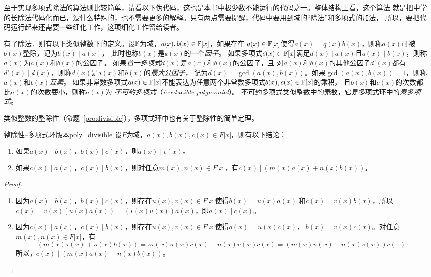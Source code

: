 至于实现多项式除法的算法则比较简单，请看以下伪代码，这也是本书中极少数不能运行的代码之一。整体结构上看，这个算法
就是把中学的长除法代码化而已，没什么特殊的，也不需要更多的解释。只有两点需要提醒，代码中要用到域的“除法”和多项式的加法，
所以，要把代码运行起来还需要一些细化工作，这项细化工作留给读者。
\begin{center}
	
\end{center}

有了除法，则有以下类似整数下的定义。设${\mathbb F}$为域，$a(x),b(x) \in {\mathbb F}\lbrack x \rbrack$，如果存在
$q(x) \in {\mathbb F}\lbrack x \rbrack$使得$a(x) = q(x)b(x)$，则称$a(x)$可被 $b(x)$整除，记为$b(x) \mid a(x)$，
此时也称$b(x)$是$a(x)$的一个\emph{因子}。
如果多项式$d(x)\in {\mathbb F}\lbrack x \rbrack$满足$d(x) \mid a(x)$且$d(x) \mid b(x)$，则称$d(x)$为$a(x)$和$b(x)$的公因子。
如果\emph{首一多项式}$d(x)$是$a(x)$和$b(x)$的公因子，且
对$a(x)$和$b(x)$的其他公因子$d'(x)$都有$d'(x) \mid d(x)$，则称$d(x)$是$a(x)$和$b(x)$的\emph{最大公因子}，
记为$d(x)=\gcd(a(x), b(x))$。如果$\gcd(a(x), b(x)) = 1$，则称$a(x)$和$b(x)$\emph{互素}。
如果非常数多项式$a(x) \in {\mathbb F}\lbrack x \rbrack$不能表达为任意两个非常数多项式$b(x), c(x)  \in {\mathbb F}\lbrack x \rbrack$的乘积，
且$b(x)$和$c(x)$的次数都比$a(x)$的次数要小，则称$a(x)$为
\emph{不可约多项式}（\emph{irreducible polynomial}）。
不可约多项式类似整数中的素数，它是多项式环中的\emph{素多项式}。

类似整数的整除性（命题~\ref{pro:divisible}），多项式环中也有关于整除性的简单定理。
\begin{proposition}{整除性--多项式环版本}{poly_divisible}
设$F$为域，$a(x),b(x),c(x) \in F\lbrack x \rbrack$，则有以下结论：
\begin{enumerate}
\item 如果$a(x) \mid b(x)$，$b(x) \mid c(x)$，则$a(x) \mid c(x)$。

\item 如果$c(x) \mid a(x)$，$c(x) \mid b(x)$，则对任意$m(x), n(x) \in  F\lbrack x \rbrack$，有$c(x) \mid (m(x)a(x) + n(x)b(x))$。
\end{enumerate}
\end{proposition}

\begin{proof}
\begin{enumerate}
\item 因为$a(x) \mid b(x)$，$b(x) \mid c(x)$，则存在$u(x), v(x ) \in F\lbrack x \rbrack$使得$b(x) = u(x) a(x)$
和$c(x) = v(x)b(x)$，所以$c(x) = v(x)(u(x)a(x)) = (v(x)u(x)) a(x)$，即$a(x) \mid c(x)$。 

\item 因为$c(x) \mid a(x)$，$c(x) \mid b(x)$，则存在$u(x), v(x ) \in F\lbrack x \rbrack$使得$a(x) = u(x) c(x)$，
$b(x) = v(x) c(x)$。对任意$m(x), n(x) \in  F\lbrack x \rbrack$，有
\[ (m(x)a(x) + n(x)b(x)) = m(x) u(x)c(x) + n(x)v(x)c(x) = (m(x) u(x) + n(x)v(x))c(x)\]
所以，$c(x)\mid (m(x)a(x) + n(x)b(x))$。
\end{enumerate}
\end{proof}

